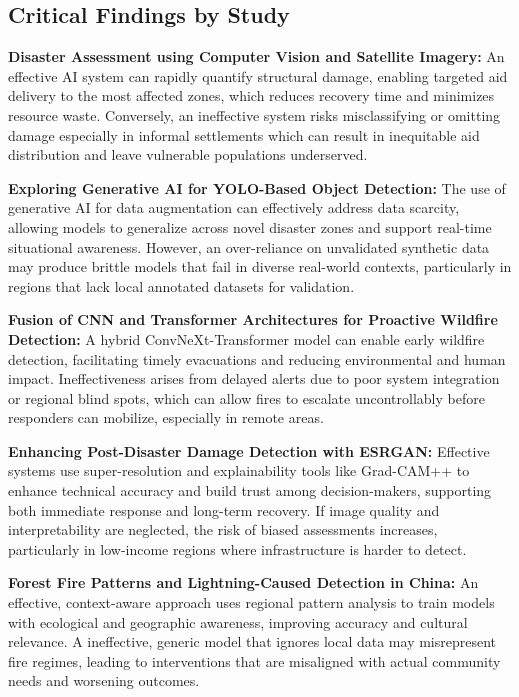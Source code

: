 \documentclass[conference,a4paper]{IEEEtran}
\begin{document}
\subsection{Critical Findings by Study}

\textbf{Disaster Assessment using Computer Vision and Satellite Imagery:}
An effective AI system can rapidly quantify structural damage, enabling targeted aid delivery to the most affected zones, which reduces recovery time and minimizes resource waste. Conversely, an ineffective system risks misclassifying or omitting damage especially in informal settlements which can result in inequitable aid distribution and leave vulnerable populations underserved.

\textbf{Exploring Generative AI for YOLO-Based Object Detection:}
The use of generative AI for data augmentation can effectively address data scarcity, allowing models to generalize across novel disaster zones and support real-time situational awareness. However, an over-reliance on unvalidated synthetic data may produce brittle models that fail in diverse real-world contexts, particularly in regions that lack local annotated datasets for validation.

\textbf{Fusion of CNN and Transformer Architectures for Proactive Wildfire Detection:}
A hybrid ConvNeXt-Transformer model can enable early wildfire detection, facilitating timely evacuations and reducing environmental and human impact. Ineffectiveness arises from delayed alerts due to poor system integration or regional blind spots, which can allow fires to escalate uncontrollably before responders can mobilize, especially in remote areas.

\textbf{Enhancing Post-Disaster Damage Detection with ESRGAN:}
Effective systems use super-resolution and explainability tools like Grad-CAM++ to enhance technical accuracy and build trust among decision-makers, supporting both immediate response and long-term recovery. If image quality and interpretability are neglected, the risk of biased assessments increases, particularly in low-income regions where infrastructure is harder to detect.

\textbf{Forest Fire Patterns and Lightning-Caused Detection in China:}
An effective, context-aware approach uses regional pattern analysis to train models with ecological and geographic awareness, improving accuracy and cultural relevance. A ineffective, generic model that ignores local data may misrepresent fire regimes, leading to interventions that are misaligned with actual community needs and worsening outcomes.
\end{document}
